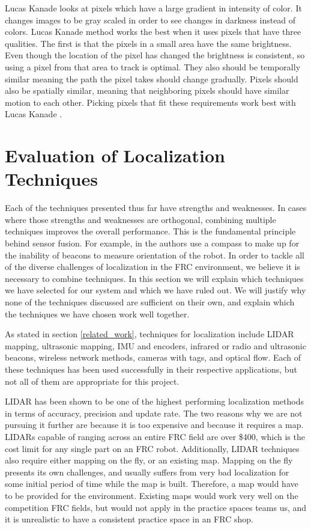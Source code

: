 \documentclass{article}
\begin{document}
	Lucas Kanade looks at pixels which have a large gradient in intensity of color. It changes images to be gray scaled in order to see changes in darkness instead of colors. Lucas Kanade method works the best when it uses pixels that have three qualities. The first is that the pixels in a small area have the same brightness. Even though the location of the pixel has changed the brightness is consistent, so using a pixel from that area to track is optimal. They also should be temporally similar meaning the path the pixel takes should change gradually. Pixels should also be spatially similar, meaning that neighboring pixels should have similar motion to each other. Picking pixels that fit these requirements work best with Lucas Kanade \cite{sun_optical_2008}.

\section{Evaluation of Localization Techniques} \label{methods}

  Each of the techniques presented thus far have strengths and weaknesses. In cases where those strengths and weaknesses are orthogonal, combining multiple techniques improves the overall performance. This is the fundamental principle behind sensor fusion. For example, in \cite{kim_advanced_2008} the authors use a compass to make up for the inability of beacons to measure orientation of the robot. In order to tackle all of the diverse challenges of localization in the FRC environment, we believe it is necessary to combine techniques. In this section we will explain which techniques we have selected for our system and which we have ruled out. We will justify why none of the techniques discussed are sufficient on their own, and explain which the techniques we have chosen work well together.

  As stated in section \ref{related_work}, techniques for localization include LIDAR mapping, ultrasonic mapping, IMU and encoders, infrared or radio and ultrasonic beacons, wireless network methods, cameras with tags, and optical flow. Each of these techniques has been used successfully in their respective applications, but not all of them are appropriate for this project.

  LIDAR has been shown to be one of the highest performing localization methods in terms of accuracy, precision and update rate. The two reasons why we are not pursuing it further are because it is too expensive and because it requires a map. LIDARs capable of ranging across an entire FRC field are over \$400, which is the cost limit for any single part on an FRC robot. Additionally, LIDAR techniques also require either mapping on the fly, or an existing map. Mapping on the fly presents its own challenges, and usually suffers from very bad localization for some initial period of time while the map is built. Therefore, a map would have to be provided for the environment. Existing maps would work very well on the competition FRC fields, but would not apply in the practice spaces teams us, and it is unrealistic to have a consistent practice space in an FRC shop.
\end{document}
